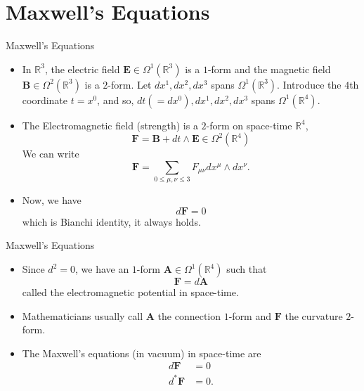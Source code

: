 \documentclass{beamer}
\theoremstyle{definition}
\begin{document}
	\section{Maxwell's Equations}
	\begin{frame}{Maxwell's Equations}{}
		\begin{itemize}
            \item<1-> {In $\mathbb{R}^3$, the electric field $\mathbf{E} \in \Omega^1(\mathbb{R}^3)$ is a $1$-form and the magnetic field $\mathbf{B} \in \Omega^2(\mathbb{R}^3)$ is a $2$-form. Let $dx^1, dx^2, dx^3$ spans $\Omega^1(\mathbb{R}^3)$. Introduce the $4$th coordinate $t = x^0$, and so, $dt (= dx^0), dx^1, dx^2, dx^3$ spans $\Omega^1(\mathbb{R}^4)$.}
            \item<2-> {The Electromagnetic field (strength) is a $2$-form on space-time $\mathbb{R}^4$,
            $$\mathbf{F} = \mathbf{B} + dt \wedge \mathbf{E} \in \Omega^2(\mathbb{R}^4)$$
            We can write
            $$\mathbf{F} = \sum\limits_{0 \leq \mu , \nu \leq 3} F_{\mu\nu}dx^\mu \wedge dx^\nu.$$}
            \item<3-> {Now, we have
            $$d\mathbf{F} = 0$$
            which is Bianchi identity, it always holds. }
        \end{itemize}
	\end{frame}
	\begin{frame}{Maxwell's Equations}{}
		\begin{itemize}
            \item<1-> {Since $d^2 = 0$, we have an $1$-form $\mathbf{A} \in \Omega^1(\mathbb{R}^4)$ such that
        $$\mathbf{F} = d\mathbf{A}$$
        called the electromagnetic potential in space-time.}
            \item<2-> {Mathematicians usually call $\mathbf{A}$ the connection $1$-form and $\mathbf{F}$ the curvature $2$-form.}
            \item<3-> {The Maxwell's equations (in vacuum) in space-time are 
            \begin{align*}
            d\mathbf{F} &= 0\\
            d^*\mathbf{F} &= 0.
\end{align*}}
        \end{itemize}
	\end{frame}
\end{document}
